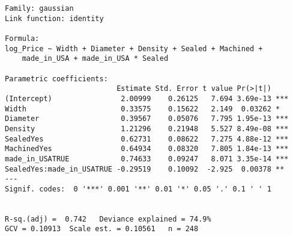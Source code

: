 \begin{verbatim}
Family: gaussian 
Link function: identity 

Formula:
log_Price ~ Width + Diameter + Density + Sealed + Machined + 
    made_in_USA + made_in_USA * Sealed

Parametric coefficients:
                          Estimate Std. Error t value Pr(>|t|)    
(Intercept)                2.00999    0.26125   7.694 3.69e-13 ***
Width                      0.33575    0.15622   2.149  0.03262 *  
Diameter                   0.39567    0.05076   7.795 1.95e-13 ***
Density                    1.21296    0.21948   5.527 8.49e-08 ***
SealedYes                  0.62731    0.08622   7.275 4.88e-12 ***
MachinedYes                0.64934    0.08320   7.805 1.84e-13 ***
made_in_USATRUE            0.74633    0.09247   8.071 3.35e-14 ***
SealedYes:made_in_USATRUE -0.29519    0.10092  -2.925  0.00378 ** 
---
Signif. codes:  0 '***' 0.001 '**' 0.01 '*' 0.05 '.' 0.1 ' ' 1


R-sq.(adj) =  0.742   Deviance explained = 74.9%
GCV = 0.10913  Scale est. = 0.10561   n = 248
\end{verbatim}